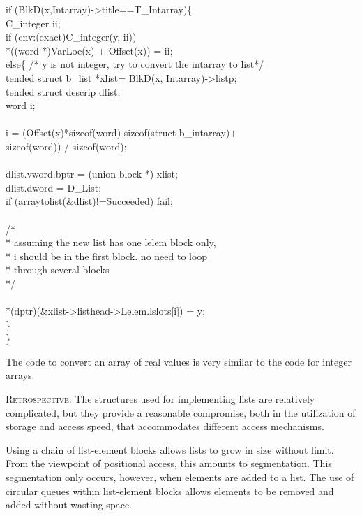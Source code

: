 \begin{iconcode}
if (BlkD(x,Intarray)->title==T\_Intarray)\{\\
\>C\_integer ii;\\
\>if (cnv:(exact)C\_integer(y, ii)) \\
\>\> *((word *)VarLoc(x) + Offset(x)) = ii;\\
\>else\{ /* y is not integer, try to convert the intarray to list*/\\
\>\>   tended struct b\_list *xlist= BlkD(x, Intarray)->listp;\\
\>\>   tended struct descrip dlist;\\
\>\>   word i;\\
\>\>   \\
\>\>   i = (Offset(x)*sizeof(word)-sizeof(struct b\_intarray)+\\
\>\>  sizeof(word)) / sizeof(word);\\
\>\>   \\
\>\>   dlist.vword.bptr = (union block *) xlist;\\
\>\>   dlist.dword = D\_List;		     \\
\>\>   if (arraytolist(\&dlist)!=Succeeded) fail;\\
\>\>   \\
\>\>   /* \\
\>\>   * assuming the new list has one lelem block only, \\
\>\>   * i should be in the first block. no need to loop \\
\>\>   * through several blocks\\
\>\>   */\\
\>\>\\
\>\>   *(dptr)(\&xlist->listhead->Lelem.lslots[i]) = y;\\
\>  \}\\
\}
\end{iconcode}

The code to convert an array of real values is very similar to the code for
integer arrays.

\bigskip\bigskip
\textsc{Retrospective}: The structures used for implementing lists are
relatively complicated, but they provide a reasonable compromise, both
in the utilization of storage and access speed, that accommodates
different access mechanisms.

Using a chain of list-element blocks allows lists to grow in size
without limit. From the viewpoint of positional access, this amounts
to segmentation. This segmentation only occurs, however, when elements
are added to a list. The use of circular queues within list-element
blocks allows elements to be removed and added without wasting space.

